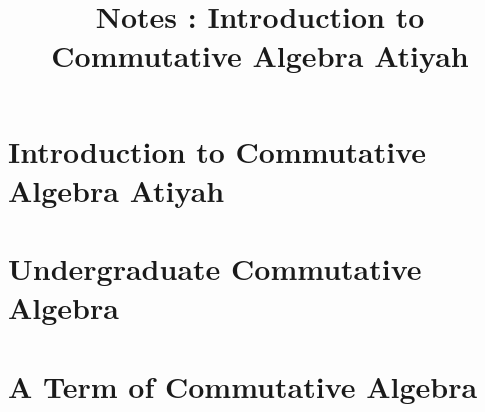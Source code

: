 \documentclass{article}
\title{Notes : Introduction to Commutative Algebra Atiyah}
\begin{document}
\tableofcontents
{}
\newpage\part{Introduction to Commutative Algebra Atiyah}
\newpage\part{Undergraduate Commutative Algebra}
\newpage\part{A Term of Commutative Algebra}
\newpage

\end{document}
